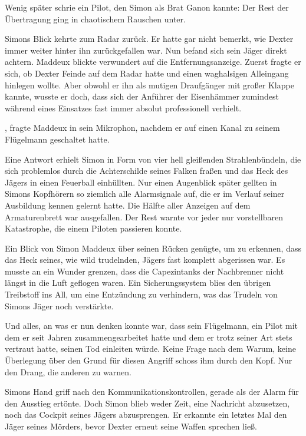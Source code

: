 \par

Wenig später schrie ein Pilot, den Simon als Brat Ganon kannte:  Der Rest der Übertragung ging in chaotischem Rauschen unter.

\par

Simons Blick kehrte zum Radar zurück. Er hatte gar nicht bemerkt, wie Dexter immer weiter hinter ihn zurückgefallen war. Nun befand sich sein Jäger direkt achtern. Maddeux blickte verwundert auf die Entfernungsanzeige. Zuerst fragte er sich, ob Dexter Feinde auf dem Radar hatte und einen waghalsigen Alleingang hinlegen wollte. Aber obwohl er ihn als mutigen Draufgänger mit großer Klappe kannte, wusste er doch, dass sich der Anführer der Eisenhämmer zumindest während eines Einsatzes fast immer absolut professionell verhielt.

\par

, fragte Maddeux in sein Mikrophon, nachdem er auf einen Kanal zu seinem Flügelmann geschaltet hatte. 

\par

Eine Antwort erhielt Simon in Form von vier hell gleißenden Strahlenbündeln, die sich problemlos durch die Achterschilde seines Falken fraßen und das Heck des Jägers in einen Feuerball einhüllten. Nur einen Augenblick später gellten in Simons Kopfhörern so ziemlich alle Alarmsignale auf, die er im Verlauf seiner Ausbildung kennen gelernt hatte. Die Hälfte aller Anzeigen auf dem Armaturenbrett war ausgefallen. Der Rest warnte vor jeder nur vorstellbaren Katastrophe, die einem Piloten passieren konnte.

\par

Ein Blick von Simon Maddeux über seinen Rücken genügte, um zu erkennen, dass das Heck seines, wie wild trudelnden, Jägers fast komplett abgerissen war. Es musste an ein Wunder grenzen, dass die Capezintanks der Nachbrenner nicht längst in die Luft geflogen waren. Ein Sicherungssystem blies den übrigen Treibstoff ins All, um eine Entzündung zu verhindern, was das Trudeln von Simons Jäger noch verstärkte.

\par

Und alles, an was er nun denken konnte war, dass sein Flügelmann, ein Pilot mit dem er seit Jahren zusammengearbeitet hatte und dem er trotz seiner Art stets vertraut hatte, seinen Tod einleiten würde. Keine Frage nach dem Warum, keine Überlegung über den Grund für diesen Angriff schoss ihm durch den Kopf. Nur den Drang, die anderen zu warnen.

\par

Simons Hand griff nach den Kommunikationskontrollen, gerade als der Alarm für den Ausstieg ertönte. Doch Simon blieb weder Zeit, eine Nachricht abzusetzen, noch das Cockpit seines Jägers abzusprengen. Er erkannte ein letztes Mal den Jäger seines Mörders, bevor Dexter erneut seine Waffen sprechen ließ.
